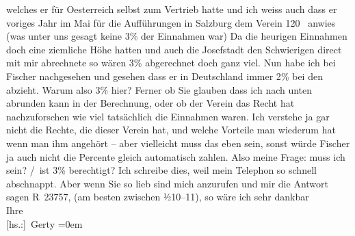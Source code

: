 \begin{ledgroupsized}[t]{13cm}
                    welches er für Oesterreich selbst zum
                    Vertrieb hatte und ich weiss auch dass er voriges Jahr im Mai für
                    die Aufführungen in Salzburg dem Verein
                        120 \label{K_L02525_1v}\label{K_L02525_1h} anwies (was unter uns gesagt keine 3{\%} der Einnahmen war) Da die heurigen Einnahmen doch
                    eine ziemliche Höhe hatten und auch die Josefstadt den Schwierigen direct
                    mit mir abrechnete so wären 3{\%}{ } abgerechnet doch ganz
                    viel.\pend
           \pstart
           Nun habe ich bei Fischer nachgesehen und gesehen
                    dass er in Deutschland immer 2{\%} bei den \label{T_L02525_1v}\label{T_L02525_1h} abzieht. Warum also 3{\%} hier? Ferner ob Sie glauben dass ich nach unten
                    abrunden kann in der Berechnung, oder ob der Verein das Recht hat nachzuforschen wie viel tatsächlich
                    die Einnahmen waren. Ich verstehe ja gar nicht die Rechte, die dieser Verein hat, und welche
                    Vorteile man wiederum hat wenn man ihm angehört – aber vielleicht muss das eben
                    sein, sonst würde Fischer ja auch nicht die Percente gleich automatisch
                    zahlen.\pend
           \pstart
           Also meine Frage: muss ich  sein?\pend
           / ist 3{\%} berechtigt?\pend
           \pstart
           Ich schreibe dies, weil mein Telephon so schnell abschnappt. Aber wenn Sie so
                    lieb sind mich anzurufen und mir die Antwort sagen R 23757, (am besten zwischen
                        ½10–11), so wäre ich sehr dankbar\pend
           \pstart
           \label{T_L02525_2v}\label{T_L02525_2h}{\\[\baselineskip]}Ihre{\\[\baselineskip]}\spacefill\mbox{{[}hs.:{]} Gerty}\pend
           \leftskip=0em{}
         
         \endnumbering{}\end{ledgroupsized}  \newcommand{\dateiname}{L02525}\newcommand{\titel}{Gerty von Hofmannsthal an Arthur Schnitzler, 23. 11. 1929}\newcommand{\editorInnen}{Martin Anton Müller und Gerd-Hermann Susen}
      